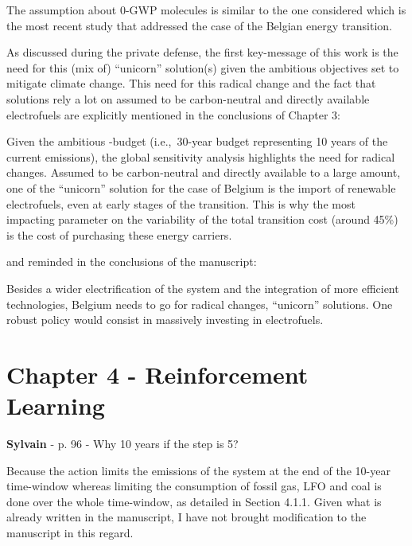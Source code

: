 \documentclass[12pt,a4paper]{article}
\def\ie{i.e.,\ }
\begin{document}
The assumption about 0-GWP molecules is similar to the one considered \cite{PATHS2050} which is the most recent study that addressed the case of the Belgian energy transition. 

As discussed during the private defense, the first key-message of this work is the need for this (mix of) ``unicorn'' solution(s) given the ambitious objectives set to mitigate climate change.  This need for this radical change and the fact that solutions rely a lot on assumed to be carbon-neutral and directly available electrofuels are explicitly mentioned {\color{blue}in the conclusions of Chapter 3}: 

\begin{mdframed}[style=manuscript] %
Given the ambitious -budget (\ie 30-year budget representing 10 years of the current emissions), the global sensitivity analysis highlights the need for radical changes. Assumed to be carbon-neutral and directly available to a large amount, one of the ``unicorn'' solution for the case of Belgium is the import of renewable electrofuels, even at early stages of the transition. This is why the most impacting parameter on the variability of the total transition cost (around 45\%) is the cost of purchasing these energy carriers.
\end{mdframed}

and reminded {\color{blue}in the conclusions of the manuscript}:

\begin{mdframed}[style=manuscript] %
Besides a wider electrification of the system and the integration of more efficient technologies, Belgium needs to go for radical changes, ``unicorn'' solutions. One robust policy would consist in massively investing in electrofuels.
\end{mdframed}

\section{Chapter 4 - Reinforcement Learning}
\label{Chap_RL}

\begin{mdframed}[style=comment] %
{\color{purple} \textbf{Sylvain}} - p. 96 - Why 10 years if the step is 5?
\end{mdframed}

\noindent Because the action limits the emissions of the system at the end of the 10-year time-window whereas limiting the consumption of fossil gas, LFO and coal is done over the whole time-window, as detailed in Section 4.1.1. Given what is already written in the manuscript, I have not brought modification to the manuscript in this regard.
\end{document}

